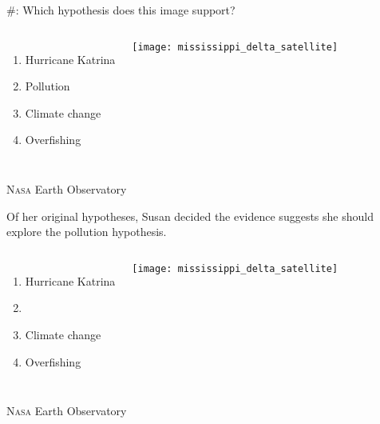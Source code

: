 \documentclass[t]{beamer}
\newcommand*{\cq}[1]{%
	\#{\lining#1}:%
}
\begin{document}
%
\begin{frame}{\cq{3} Which hypothesis does this image support?}

	\begin{columns}[t]
			\begin{enumerate}
				\item Hurricane Katrina
				\item Pollution
				\item Climate change
				\item Overfishing
			\end{enumerate}
			

			\texttt{[image: mississippi\_delta\_satellite]}

	\end{columns}

	\vfilll
	
	\hfill \tiny \textsc{Nasa} Earth Observatory

\end{frame}
%

\begin{frame}{Of her original hypotheses, Susan decided the evidence suggests she should explore the pollution hypothesis.}

	\begin{columns}[t]
			\begin{enumerate}
				\item Hurricane Katrina
				\item {}
				\item Climate change
				\item Overfishing
			\end{enumerate}
			

			\texttt{[image: mississippi\_delta\_satellite]}

	\end{columns}
	

	\vfilll
	
	\hfill \tiny \textsc{Nasa} Earth Observatory

\end{frame}
%
\end{document}
